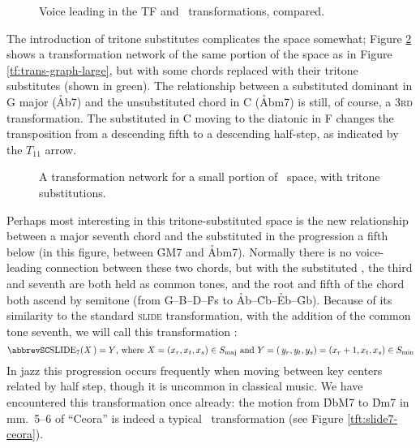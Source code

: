 \begin{figure}[htbp]
  \caption{Voice leading in the TF and \tft\ transformations, compared.}
  \label{tft:voice-leading-tft}
\end{figure}

The introduction of tritone substitutes complicates the space somewhat; Figure
\ref{tft:tft-space-extract} shows a transformation network of the same portion
of the space as in Figure \ref{tf:trans-graph-large}, but with some chords
replaced with their tritone substitutes (shown in green). The relationship
between a substituted dominant in G major (\h{Ab7}) and the unsubstituted \ii
chord in C (\h{Abm7}) is still, of course, a \textsc{3rd} transformation. The
substituted \V in C moving to the diatonic \V in F changes the
transposition from a descending fifth to a descending half-step, as indicated
by the $T_{11}$ arrow.

\begin{figure}[tbp]
  \caption{A transformation network for a small portion of \tf\ space, with
    tritone substitutions.}
  \label{tft:tft-space-extract}
\end{figure}

Perhaps most interesting in this tritone-substituted space is the new
relationship between a major seventh chord and the substituted \ii in
the progression a fifth below (in this figure, between \h{GM7} and \h{Abm7}).
Normally there is no voice-leading connection between these two chords, but
with the substituted \ii, the third and seventh are both held as common
tones, and the root and fifth of the chord both ascend by semitone (from
G--B--D--\h{Fs} to \h{Ab}--\h{Cb}--\h{Eb}--\h{Gb}). Because of its
similarity to the standard \textsc{slide} transformation, with the addition of
the common tone seventh, we will call this transformation \slideS:
%
{\novspace%
\begin{displaymath}
    \text{\slideS}(X\,) = Y\text{, where}\ X = (x_r, x_t, x_s) \in \Smaj
     \text{ and}\
    Y = (\,y_r, y_t, y_s) = (x_r + 1, x_t, x_s) \in \Smin
\end{displaymath}}%
%
In jazz this progression occurs frequently when moving between key
centers related by half step, though it is uncommon in classical
music.\fn{tft-4} We have encountered this transformation once already: the
motion from \h{DbM7} to \h{Dm7} in mm.~5--6 of ``Ceora'' is indeed a typical
\slideS\ transformation (see Figure \ref{tft:slide7-ceora}).


